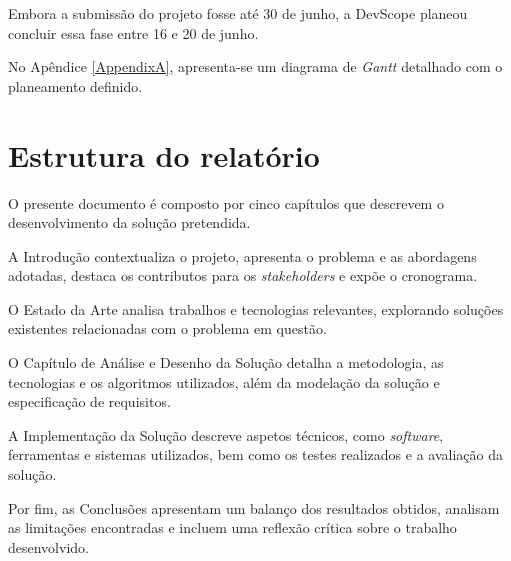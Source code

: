 Embora a submissão do projeto fosse até 30 de junho, a DevScope planeou concluir essa fase entre 16 e 20 de junho.

 No Apêndice \ref{AppendixA}, apresenta-se um diagrama de \textit{Gantt} detalhado com o planeamento definido.

\section{Estrutura do relatório}

O presente documento é composto por cinco capítulos que descrevem o desenvolvimento da solução pretendida.

A Introdução contextualiza o projeto, apresenta o problema e as abordagens adotadas, destaca os contributos para os \textit{stakeholders} e expõe o cronograma.

O Estado da Arte analisa trabalhos e tecnologias relevantes, explorando soluções existentes relacionadas com o problema em questão.

O Capítulo de Análise e Desenho da Solução detalha a metodologia, as tecnologias e os algoritmos utilizados, além da modelação da solução e especificação de requisitos.

A Implementação da Solução descreve aspetos técnicos, como \textit{software}, ferramentas e sistemas utilizados, bem como os testes realizados e a avaliação da solução.

Por fim, as Conclusões apresentam um balanço dos resultados obtidos, analisam as limitações encontradas e incluem uma reflexão crítica sobre o trabalho desenvolvido.

\vspace{20mm} 
